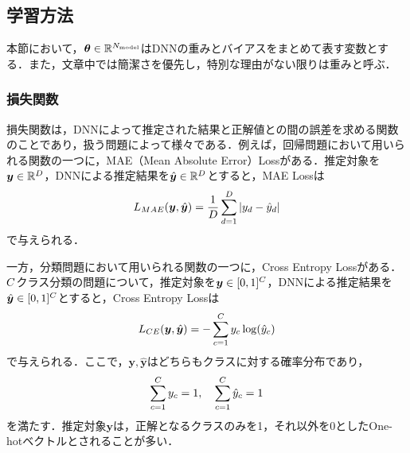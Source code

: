 \documentclass[12pt]{jarticle}
\numberwithin{equation}{section}    %
\numberwithin{figure}{section}      %
\numberwithin{table}{section}      %
\begin{document}
\subsection{学習方法}
本節において，$\bm{\theta} \in \mathbb{R}^{N_{\text{model}}}$はDNNの重みとバイアスをまとめて表す変数とする．また，文章中では簡潔さを優先し，特別な理由がない限りは重みと呼ぶ．

\subsubsection{損失関数}
損失関数は，DNNによって推定された結果と正解値との間の誤差を求める関数のことであり，扱う問題によって様々である．例えば，回帰問題において用いられる関数の一つに，MAE（Mean Absolute Error）Lossがある．推定対象を$\bm{y} \in \mathbb{R}^{D}$，DNNによる推定結果を$\hat{\bm{y}} \in \mathbb{R}^{D}$とすると，MAE Lossは
\begin{equation}
    L_{MAE}(\bm{y}, \hat{\bm{y}}) = \frac{1}{D} \sum_{d = 1}^{D}  |y_{d} - \hat{y}_{d}|
\end{equation}
で与えられる．

一方，分類問題において用いられる関数の一つに，Cross Entropy Lossがある．$C$クラス分類の問題について，推定対象を$\bm{y} \in [0, 1]^{C}$，DNNによる推定結果を$\hat{\bm{y}} \in [0, 1]^{C}$とすると，Cross Entropy Lossは
\begin{equation}
    L_{CE}(\bm{y}, \hat{\bm{y}}) = - \sum_{c = 1}^{C} y_{c}\log(\hat{y}_{c})
\end{equation}
で与えられる．ここで，$\bm{y}, \hat{\bm{y}}$はどちらもクラスに対する確率分布であり，
\begin{equation}
    \sum_{c = 1}^{C} y_{c} = 1, \quad \sum_{c = 1}^{C} \hat{y}_{c} = 1
\end{equation}
を満たす．推定対象$\bm{y}$は，正解となるクラスのみを1，それ以外を0としたOne-hotベクトルとされることが多い．
\end{document}
